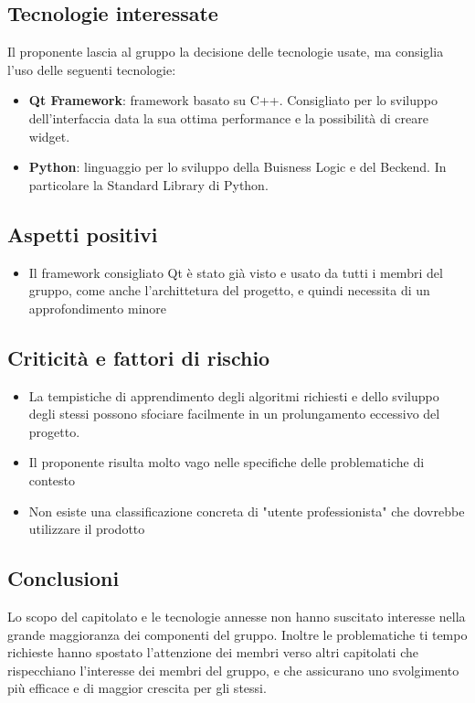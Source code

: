 \subsection{Tecnologie interessate}
Il proponente lascia al gruppo la decisione delle tecnologie usate, ma consiglia l'uso delle seguenti tecnologie:
\begin{itemize}
    \item \textbf{Qt Framework}: framework basato su C++. Consigliato per lo sviluppo dell'interfaccia data la sua ottima performance e la possibilità di creare widget.
    \item \textbf{Python}: linguaggio per lo sviluppo della Buisness Logic e del Beckend. In particolare la Standard Library di Python.
\end{itemize}
\subsection{Aspetti positivi}
\begin{itemize}
    \item Il framework consigliato Qt è stato già visto e usato da tutti i membri del gruppo, come anche l'archittetura del progetto, e quindi necessita di un approfondimento minore
\end{itemize}
\subsection{Criticità e fattori di rischio}
\begin{itemize}
    \item La tempistiche di apprendimento degli algoritmi richiesti e dello sviluppo degli stessi possono sfociare facilmente in un prolungamento eccessivo del progetto.
    \item Il proponente risulta molto vago nelle specifiche delle problematiche di contesto
    \item Non esiste una classificazione concreta di "utente professionista" che dovrebbe utilizzare il prodotto
\end{itemize}
\subsection{Conclusioni}
Lo scopo del capitolato e le tecnologie annesse non hanno suscitato interesse nella grande maggioranza dei componenti del gruppo. Inoltre le problematiche ti tempo richieste hanno spostato l'attenzione dei membri verso altri capitolati che rispecchiano l'interesse dei membri del gruppo, e che assicurano uno svolgimento più efficace e di maggior crescita per gli stessi.
